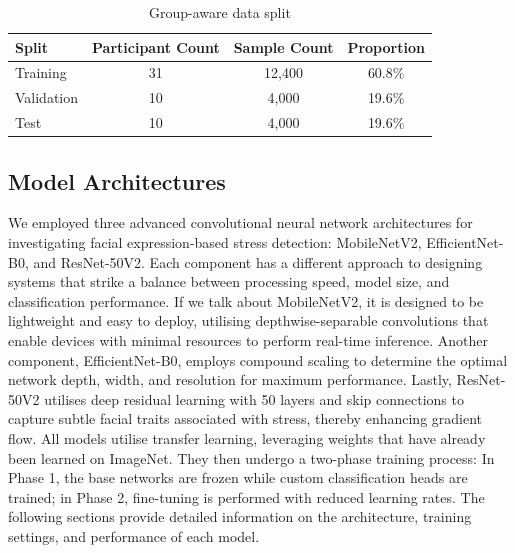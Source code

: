 \documentclass[fleqn,10pt]{wlscirep}
\begin{document}
\begin{table}[htbp]
\centering
\caption{Group-aware data split}
\label{tab:group-aware_datasplit}
\begin{tabular}{lccc}
\toprule
Split & Participant Count & Sample Count & Proportion \\
\midrule
Training & 31 & 12,400 & 60.8\% \\
Validation & 10 & 4,000 & 19.6\% \\
Test & 10 & 4,000 & 19.6\% \\
\bottomrule
\end{tabular}
\end{table}



\subsection*{Model Architectures}
We employed three advanced convolutional neural network architectures for investigating facial expression-based stress detection: MobileNetV2, EfficientNet-B0, and ResNet-50V2. Each component has a different approach to designing systems that strike a balance between processing speed, model size, and classification performance. If we talk about MobileNetV2, it is designed to be lightweight and easy to deploy, utilising depthwise-separable convolutions that enable devices with minimal resources to perform real-time inference. Another component, EfficientNet-B0, employs compound scaling to determine the optimal network depth, width, and resolution for maximum performance. Lastly, ResNet-50V2 utilises deep residual learning with 50 layers and skip connections to capture subtle facial traits associated with stress, thereby enhancing gradient flow. All models utilise transfer learning, leveraging weights that have already been learned on ImageNet. They then undergo a two-phase training process: In Phase 1, the base networks are frozen while custom classification heads are trained; in Phase 2, fine-tuning is performed with reduced learning rates. The following sections provide detailed information on the architecture, training settings, and performance of each model.
\end{document}
